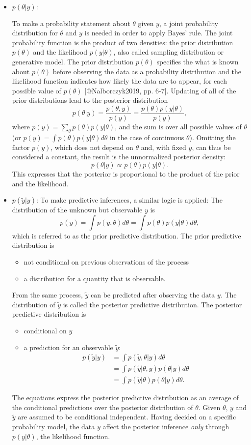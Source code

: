 \documentclass[a4, 12pt]{article}
\begin{document}
\begin{itemize}
\item $p(\theta|y)$:

To make a probability statement about $\theta$ given $y$, a joint probability distribution for $\theta$ and $y$ is needed in order to apply Bayes' rule. The joint probability function is  the product of two densities: the prior distribution $p(\theta)$ and the likelihood $p(y|\theta)$, also called sampling distribution or generative model.
The prior distribution $p(\theta)$ specifies the what is known about $p(\theta)$ before observing the data as a probability distribution and the likelihood function indicates how likely the data are to appear, for each possible value of $p(\theta)$ [@Nalborczyk2019, pp. 6-7].
Updating of all of the prior distributions lead to the posterior distribution $$p(\theta|y)=\frac{p(\theta,y)}{p(y)}=\frac{p(\theta)p(y|\theta)}{p(y)},$$ where $p(y)=\sum_\theta{p(\theta)p(y|\theta)}$, and the sum is over all possible values of $\theta$ (or $p(y)=\int p(\theta)p(y|\theta)d\theta$ in the case of continuous $\theta$). Omitting the factor $p(y)$, which does not depend on $\theta$ and, with fixed $y$, can thus be considered a constant, the result is the unnormalized posterior density:
$$p(\theta|y) \propto p(\theta)p(y|\theta).$$ This expresses that the posterior is proportional to the product of the prior and the likelihood.

\item $p(\tilde y|y)$:
To make predictive inferences, a similar logic is applied:
The distribution of the unknown but observable $y$ is
$$p(y)=\int p(y,\theta)d\theta=\int p(\theta)p(y|\theta)d\theta,$$ which is referred to as the prior predictive distribution. The prior predictive distribution is
\begin{itemize}
\item not conditional on previous observations of the process
\item a distribution for a quantity that is observable.
\end{itemize}
From the same process, $\tilde{y}$ can be predicted after observing the data $y$.
The distribution of $\tilde{y}$ is called the posterior predictive distribution. The posterior predictive distribution is
\begin{itemize}
\item conditional on $y$
\item a prediction for an observable $\tilde y:$
\begin{align*}
p(\tilde{y}|y) & =\int p(\tilde{y},\theta|y)d\theta \\
& = \int p(\tilde{y}|\theta,y)p(\theta|y)d\theta \\
& = \int p(\tilde{y}|\theta)p(\theta|y)d\theta.
\end{align*}
\end{itemize}
The equations express the posterior predictive distribution as an average of the conditional predictions over the posterior distribution of $\theta$. Given $\theta$, $y$ and $\tilde{y}$ are assumed to be conditional independent.
Having decided on a specific probability model, the data $y$ affect the posterior inference \emph{only} through $p(y|\theta)$, the likelihood function. 
\end{itemize}
\end{document}
